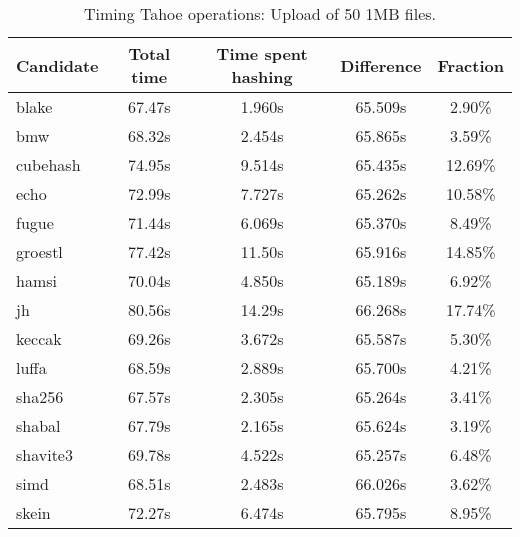 \begin{table}[h]
  \centering
  \begin{tabular}{ | l | c | c | c | c | }
    \hline
    Candidate & Total time & Time spent hashing & Difference & Fraction \\ \hline
    blake & 67.47s & 1.960s & 65.509s & 2.90\% \\ \hline
    bmw & 68.32s & 2.454s & 65.865s & 3.59\% \\ \hline
    cubehash & 74.95s & 9.514s & 65.435s & 12.69\% \\ \hline
    echo & 72.99s & 7.727s & 65.262s & 10.58\% \\ \hline
    fugue & 71.44s & 6.069s & 65.370s & 8.49\% \\ \hline
    groestl & 77.42s & 11.50s & 65.916s & 14.85\% \\ \hline
    hamsi & 70.04s & 4.850s & 65.189s & 6.92\% \\ \hline
    jh & 80.56s & 14.29s & 66.268s & 17.74\% \\ \hline
    keccak & 69.26s & 3.672s & 65.587s & 5.30\% \\ \hline
    luffa & 68.59s & 2.889s & 65.700s & 4.21\% \\ \hline
    sha256 & 67.57s & 2.305s & 65.264s & 3.41\% \\ \hline
    shabal & 67.79s & 2.165s & 65.624s & 3.19\% \\ \hline
    shavite3 & 69.78s & 4.522s & 65.257s & 6.48\% \\ \hline
    simd & 68.51s & 2.483s & 66.026s & 3.62\% \\ \hline
    skein & 72.27s & 6.474s & 65.795s & 8.95\% \\ \hline
  \end{tabular}
  \caption{Timing Tahoe operations: Upload of 50 1MB files.}
  \label{tbl:hashingtimes:put1mb}
\end{table}

